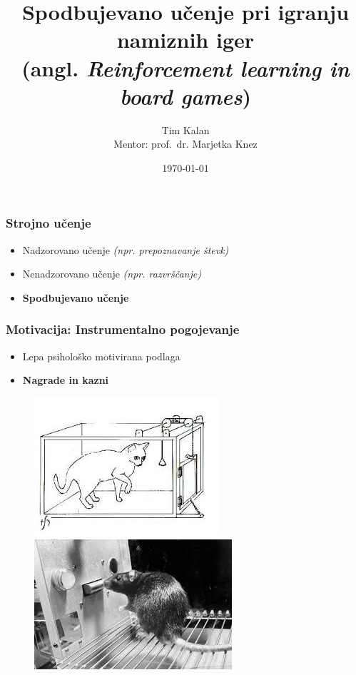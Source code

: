 \documentclass{beamer}    %
\author{Tim Kalan \\ \medskip
        \footnotesize Mentor: prof.~dr. Marjetka Knez}
\institute[FMF]{Fakulteta za matematiko in fiziko}
\title{
    Spodbujevano učenje pri igranju namiznih iger \\ 
    \large (angl. \textit{Reinforcement learning in board games})}
\date{\today}
\begin{document}
\begin{frame}
    \titlepage
\end{frame}


\begin{frame}
    \frametitle{Strojno učenje}
    \begin{itemize}
        \item Nadzorovano učenje \textit{(npr. prepoznavanje števk)}
        \item Nenadzorovano učenje \textit{(npr. razvrščanje)}
        \item \textbf{Spodbujevano učenje}
    \end{itemize}
\end{frame}


\begin{frame}
    \frametitle{Motivacija: Instrumentalno pogojevanje}
    \begin{itemize}
        \item Lepa psihološko motivirana podlaga
        \item \textbf{Nagrade in kazni} 
    \end{itemize}

    \begin{figure}[b]
        \includegraphics[scale=0.47]{slike/macka.jpg}
        \includegraphics[scale=0.5]{slike/miska.jpg}
    \end{figure}
\end{frame}
\end{document}
